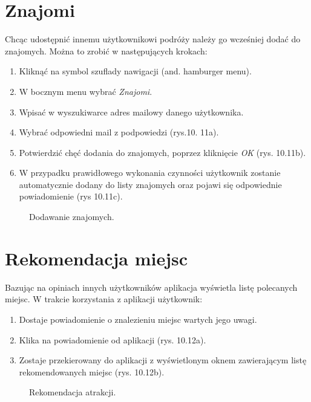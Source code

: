 \section{Znajomi}
Chcąc udostępnić innemu użytkownikowi podróży należy go wcześniej dodać do znajomych. Można to zrobić w następujących krokach:
\begin{enumerate}
\item Kliknąć na symbol szuflady nawigacji (and. hamburger menu).
\item W bocznym menu wybrać \textit{Znajomi}.
\item Wpisać w wyszukiwarce adres mailowy danego użytkownika.
\item Wybrać odpowiedni mail z podpowiedzi (rys.10. 11a).
\item Potwierdzić chęć dodania do znajomych, poprzez kliknięcie \textit{OK} (rys. 10.11b).
\item W przypadku prawidłowego wykonania czynności użytkownik zostanie automatycznie dodany do listy znajomych oraz pojawi się odpowiednie powiadomienie (rys 10.11c).
\end{enumerate}

\begin{figure}[h]

\null\hfill
{}
\hfill
{}
\hfill
{}
\hfill\null

\caption{Dodawanie znajomych.}
\label{fig:podrecznik9}
\end{figure}
\FloatBarrier


\section{Rekomendacja miejsc}
Bazując na opiniach innych użytkowników aplikacja wyświetla listę polecanych miejsc. W trakcie korzystania z aplikacji użytkownik:
\begin{enumerate}
\item Dostaje powiadomienie o znalezieniu miejsc wartych jego uwagi.
\item Klika na powiadomienie od aplikacji (rys. 10.12a).
\item Zostaje przekierowany do aplikacji z wyświetlonym oknem zawierającym listę rekomendowanych miejsc (rys. 10.12b).
\end{enumerate}
\begin{figure}[h]

\centering
\null\hfill
{}
\hfill
{}
\hfill\null

\caption{Rekomendacja atrakcji.}
\label{fig:podrecznik11}
\end{figure}
\FloatBarrier